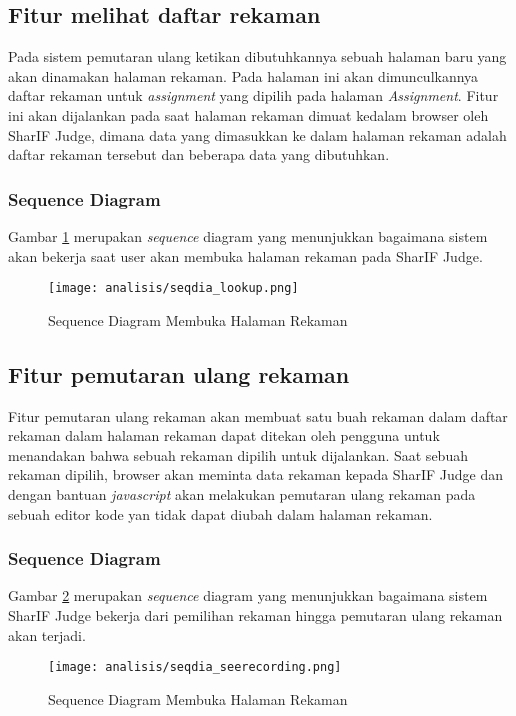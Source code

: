 \subsection{Fitur melihat daftar rekaman}
\label{sub:3:2:lookup}
Pada sistem pemutaran ulang ketikan dibutuhkannya sebuah halaman baru yang akan dinamakan halaman rekaman. Pada halaman ini akan dimunculkannya daftar rekaman untuk \textit{assignment} yang dipilih pada halaman \textit{Assignment}. Fitur ini akan dijalankan pada saat halaman rekaman dimuat kedalam browser oleh SharIF Judge, dimana data yang dimasukkan ke dalam halaman rekaman adalah daftar rekaman tersebut dan beberapa data yang dibutuhkan.

\subsubsection{Sequence Diagram}
Gambar \ref{fig:3:2:seqdia_lookup} merupakan \textit{sequence} diagram yang menunjukkan bagaimana sistem akan bekerja saat user akan membuka halaman rekaman pada SharIF Judge.
\begin{figure}[H]
	\centering
	\texttt{[image: analisis/seqdia\_lookup.png]}
	\caption{Sequence Diagram Membuka Halaman Rekaman}
	\label{fig:3:2:seqdia_lookup}
\end{figure}

\subsection{Fitur pemutaran ulang rekaman}
\label{sub:3:2:seerecording}

Fitur pemutaran ulang rekaman akan membuat satu buah rekaman dalam daftar rekaman dalam halaman rekaman dapat ditekan oleh pengguna untuk menandakan bahwa sebuah rekaman dipilih untuk dijalankan. Saat sebuah rekaman dipilih, browser akan meminta data rekaman kepada SharIF Judge dan dengan bantuan \textit{javascript} akan melakukan pemutaran ulang rekaman pada sebuah editor kode yan tidak dapat diubah dalam halaman rekaman.

\subsubsection{Sequence Diagram}
Gambar \ref{fig:3:2:seqdia_seerecording} merupakan \textit{sequence} diagram yang menunjukkan bagaimana sistem SharIF Judge bekerja dari pemilihan rekaman hingga pemutaran ulang rekaman akan terjadi.
\begin{figure}[H]
	\centering
	\texttt{[image: analisis/seqdia\_seerecording.png]}
	\caption{Sequence Diagram Membuka Halaman Rekaman}
	\label{fig:3:2:seqdia_seerecording}
\end{figure}



